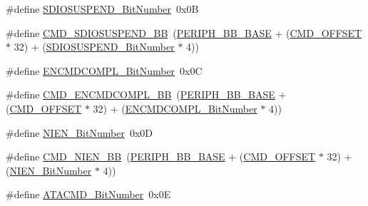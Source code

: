 \begin{DoxyCompactItemize}
\#define \hyperlink{group___s_d_i_o___private___types_definitions_gaf88f03a42d76974b55dfb8bda65ade97}{S\+D\+I\+O\+S\+U\+S\+P\+E\+N\+D\+\_\+\+Bit\+Number}~0x0B
\item 
\#define \hyperlink{group___s_d_i_o___private___types_definitions_ga931e48aa282e2a937308f57f807e0781}{C\+M\+D\+\_\+\+S\+D\+I\+O\+S\+U\+S\+P\+E\+N\+D\+\_\+\+BB}~(\hyperlink{openmotestm_2library_2inc_2stm32f10x__map_8h_aed7efc100877000845c236ccdc9e144a}{P\+E\+R\+I\+P\+H\+\_\+\+B\+B\+\_\+\+B\+A\+SE} + (\hyperlink{openmotestm_2library_2src_2stm32f10x__sdio_8c_af12d26702ce7a88d2a3dae87f000b75e}{C\+M\+D\+\_\+\+O\+F\+F\+S\+ET} $\ast$ 32) + (\hyperlink{openmotestm_2library_2src_2stm32f10x__sdio_8c_af88f03a42d76974b55dfb8bda65ade97}{S\+D\+I\+O\+S\+U\+S\+P\+E\+N\+D\+\_\+\+Bit\+Number} $\ast$ 4))
\item 
\#define \hyperlink{group___s_d_i_o___private___types_definitions_ga1d1112c7b804791a0fffd8b317085aeb}{E\+N\+C\+M\+D\+C\+O\+M\+P\+L\+\_\+\+Bit\+Number}~0x0C
\item 
\#define \hyperlink{group___s_d_i_o___private___types_definitions_gade06098d1616639ce5f1b70675280b7c}{C\+M\+D\+\_\+\+E\+N\+C\+M\+D\+C\+O\+M\+P\+L\+\_\+\+BB}~(\hyperlink{openmotestm_2library_2inc_2stm32f10x__map_8h_aed7efc100877000845c236ccdc9e144a}{P\+E\+R\+I\+P\+H\+\_\+\+B\+B\+\_\+\+B\+A\+SE} + (\hyperlink{openmotestm_2library_2src_2stm32f10x__sdio_8c_af12d26702ce7a88d2a3dae87f000b75e}{C\+M\+D\+\_\+\+O\+F\+F\+S\+ET} $\ast$ 32) + (\hyperlink{openmotestm_2library_2src_2stm32f10x__sdio_8c_a1d1112c7b804791a0fffd8b317085aeb}{E\+N\+C\+M\+D\+C\+O\+M\+P\+L\+\_\+\+Bit\+Number} $\ast$ 4))
\item 
\#define \hyperlink{group___s_d_i_o___private___types_definitions_gab6d83a7ccd4a0d9ea9a09fec263fb25f}{N\+I\+E\+N\+\_\+\+Bit\+Number}~0x0D
\item 
\#define \hyperlink{group___s_d_i_o___private___types_definitions_ga08623f1d053677de8b20a6f5f5090edd}{C\+M\+D\+\_\+\+N\+I\+E\+N\+\_\+\+BB}~(\hyperlink{openmotestm_2library_2inc_2stm32f10x__map_8h_aed7efc100877000845c236ccdc9e144a}{P\+E\+R\+I\+P\+H\+\_\+\+B\+B\+\_\+\+B\+A\+SE} + (\hyperlink{openmotestm_2library_2src_2stm32f10x__sdio_8c_af12d26702ce7a88d2a3dae87f000b75e}{C\+M\+D\+\_\+\+O\+F\+F\+S\+ET} $\ast$ 32) + (\hyperlink{openmotestm_2library_2src_2stm32f10x__sdio_8c_ab6d83a7ccd4a0d9ea9a09fec263fb25f}{N\+I\+E\+N\+\_\+\+Bit\+Number} $\ast$ 4))
\item 
\#define \hyperlink{group___s_d_i_o___private___types_definitions_gabd4fd3bb700b879f843ccc867db1832e}{A\+T\+A\+C\+M\+D\+\_\+\+Bit\+Number}~0x0E

\end{DoxyCompactItemize}
